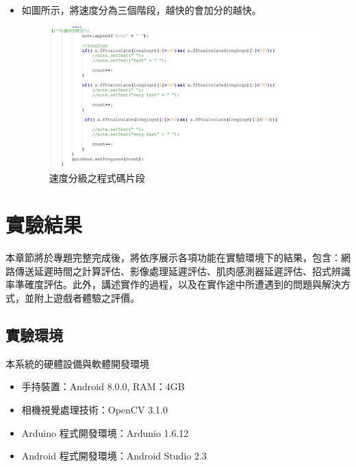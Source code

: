 \documentclass[12pt]{article}  %
\theoremstyle{plain}
\begin{document}
\begin{itemize}
\begin{itemize}
\item 如圖所示，將速度分為三個階段，越快的會加分的越快。
\begin{figure}[h]  %
\centering
\includegraphics[width=15cm]{pic/ch3/code-速度分級.JPG}
\caption{速度分級之程式碼片段}
\end{figure}
\end{itemize}
\end{itemize}

\newpage

\section{實驗結果}
本章節將於專題完整完成後，將依序展示各項功能在實驗環境下的結果，包含：網路傳送延遲時間之計算評估、影像處理延遲評估、肌肉感測器延遲評估、招式辨識率準確度評估。此外，講述實作的過程，以及在實作途中所遭遇到的問題與解決方式，並附上遊戲者體驗之評價。

\subsection{實驗環境}
本系統的硬體設備與軟體開發環境
\begin{itemize}
\item 手持裝置：Android 8.0.0, RAM：4GB
\item 相機視覺處理技術：OpenCV 3.1.0
\item Arduino 程式開發環境：Ardunio 1.6.12
\item Android 程式開發環境：Android Studio 2.3
\end{itemize}
\end{document}
